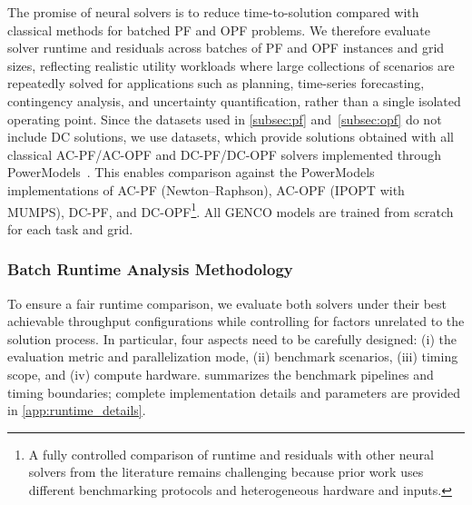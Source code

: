 

The promise of neural solvers is to reduce time-to-solution compared with classical methods for batched PF and OPF problems. We therefore evaluate solver runtime and residuals across batches of PF and OPF instances and grid sizes, reflecting realistic utility workloads where large collections of scenarios are repeatedly solved for applications such as planning, time-series forecasting, contingency analysis, and uncertainty quantification, rather than a single isolated operating point. Since the datasets used in \cref{subsec:pf} and~\ref{subsec:opf} do not include DC solutions, we use \datakit datasets, which provide solutions obtained with all classical AC-PF/AC-OPF and DC-PF/DC-OPF solvers implemented through PowerModels~\cite{powermodels}. This enables comparison against the PowerModels implementations of AC-PF (Newton--Raphson), AC-OPF (IPOPT with MUMPS), DC-PF, and DC-OPF\footnote{A fully controlled comparison of runtime and residuals with other neural solvers from the literature remains challenging because prior work uses different benchmarking protocols and heterogeneous hardware and inputs.}. All GENCO models are trained from scratch for each task and grid.

\subsubsection{Batch Runtime Analysis Methodology}



To ensure a fair runtime comparison, we evaluate both solvers under their best achievable throughput configurations while controlling for factors unrelated to the solution process. In particular, four aspects need to be carefully designed: (i) the evaluation metric and parallelization mode, (ii) benchmark scenarios, (iii) timing scope, and (iv) compute hardware.  summarizes the benchmark pipelines and timing boundaries; complete implementation details and parameters are provided in \cref{app:runtime_details}.

